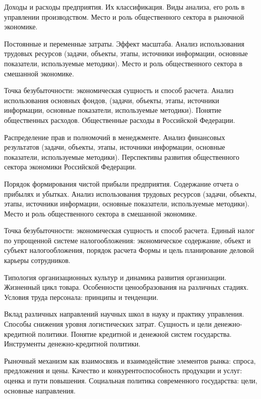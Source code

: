 \documentclass[
	11pt,
	a4paper,
	]
	{article}
\begin{document}
\bigskip

\noindent{} 
	{
		Доходы и расходы предприятия. Их классификация.
	}{
		Виды анализа, его роль в управлении производством.
	}{
		Место и роль общественного сектора в рыночной экономике.
	}

\bigskip

\noindent{} 
	{
		Постоянные и переменные затраты. Эффект масштаба.
	}{
		Анализ использования трудовых ресурсов (задачи, объекты, этапы, источники информации, основные показатели, используемые методики).
	}{
		Место и роль общественного сектора в смешанной экономике.
	}

\bigskip

\noindent{} 
	{
		Точка безубыточности: экономическая сущность и способ расчета.
	}{
		Анализ использования основных фондов, (задачи, объекты, этапы, источники информации, основные показатели, используемые методики).
	}{
		Понятие общественных расходов. Общественные расходы в Российской Федерации.
	}

\bigskip

\noindent{} 
	{
		Распределение прав и полномочий в менеджменте.
	}{
		Анализ финансовых результатов (задачи, объекты, этапы, источники информации, основные показатели, используемые методики).
	}{
		Перспективы развития общественного сектора экономики Российской Федерации.
	}

\bigskip

\noindent{} 
	{
		Порядок формирования чистой прибыли предприятия. Содержание отчета о прибылях и убытках.
	}{
		Анализ использования трудовых ресурсов (задачи, объекты, этапы, источники информации, основные показатели, используемые методики).
	}{
		Место и роль общественного сектора в смешанной экономике.
	}

\bigskip

\noindent{} 
	{
		Точка безубыточности: экономическая сущность и способ расчета.
	}{
		Единый налог по упрощенной системе налогообложения: экономическое содержание, объект и субъект налогообложения, порядок расчета
	}{
		Формы и цель планирование деловой карьеры сотрудников.
	}

\bigskip

\noindent{} 
	{
		Типология организационных культур и динамика развития организации.
	}{
		Жизненный цикл товара. Особенности ценообразования на различных стадиях.
	}{
		Условия труда персонала: принципы и тенденции.
	}

\bigskip

\noindent{} 
	{
		Вклад различных направлений научных школ в науку и практику управления.
	}{
		Способы снижения уровня логистических затрат.
	}{
		Сущность и цели денежно-кредитной политики. Понятие кредитной и денежной систем государства. Инструменты денежно-кредитной политики.
	}

\bigskip

\noindent{} 
	{
		Рыночный механизм как взаимосвязь и взаимодействие элементов рынка: спроса, предложения и цены.
	}{
		Качество и конкурентоспособность продукции и услуг: оценка и пути повышения.
	}{
		Социальная политика современного государства: цели, основные направления.
	}

\bigskip
\end{document}
